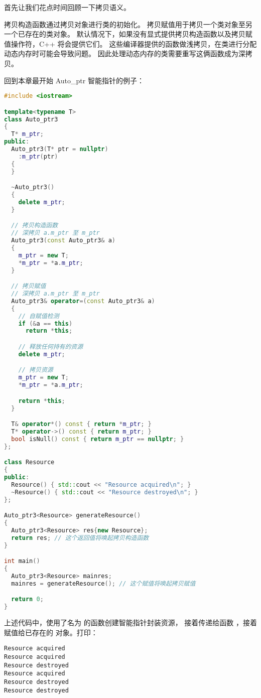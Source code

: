 \documentclass[../../LearnCpp.tex]{subfiles}
\begin{document}

首先让我们花点时间回顾一下拷贝语义。

拷贝构造函数通过拷贝对象进行类的初始化。
拷贝赋值用于拷贝一个类对象至另一个已存在的类对象。
默认情况下，如果没有显式提供拷贝构造函数以及拷贝赋值操作符，C++ 将会提供它们。
这些编译器提供的函数做浅拷贝，在类进行分配动态内存时可能会导致问题。
因此处理动态内存的类需要重写这俩函数成为深拷贝。

回到本章最开始 Auto\_ptr 智能指针的例子：

\begin{lstlisting}[language=C++]
#include <iostream>

template<typename T>
class Auto_ptr3
{
  T* m_ptr;
public:
  Auto_ptr3(T* ptr = nullptr)
    :m_ptr(ptr)
  {
  }

  ~Auto_ptr3()
  {
    delete m_ptr;
  }

  // 拷贝构造函数
  // 深拷贝 a.m_ptr 至 m_ptr
  Auto_ptr3(const Auto_ptr3& a)
  {
    m_ptr = new T;
    *m_ptr = *a.m_ptr;
  }

  // 拷贝赋值
  // 深拷贝 a.m_ptr 至 m_ptr
  Auto_ptr3& operator=(const Auto_ptr3& a)
  {
    // 自赋值检测
    if (&a == this)
      return *this;

    // 释放任何持有的资源
    delete m_ptr;

    // 拷贝资源
    m_ptr = new T;
    *m_ptr = *a.m_ptr;

    return *this;
  }

  T& operator*() const { return *m_ptr; }
  T* operator->() const { return m_ptr; }
  bool isNull() const { return m_ptr == nullptr; }
};

class Resource
{
public:
  Resource() { std::cout << "Resource acquired\n"; }
  ~Resource() { std::cout << "Resource destroyed\n"; }
};

Auto_ptr3<Resource> generateResource()
{
  Auto_ptr3<Resource> res{new Resource};
  return res; // 这个返回值将唤起拷贝构造函数
}

int main()
{
  Auto_ptr3<Resource> mainres;
  mainres = generateResource(); // 这个赋值将唤起拷贝赋值

  return 0;
}
\end{lstlisting}

上述代码中，使用了名为  的函数创建智能指针封装资源，
接着传递给函数 ，接着赋值给已存在的  对象。打印：

\begin{lstlisting}
Resource acquired
Resource acquired
Resource destroyed
Resource acquired
Resource destroyed
Resource destroyed
\end{lstlisting}
\end{document}
